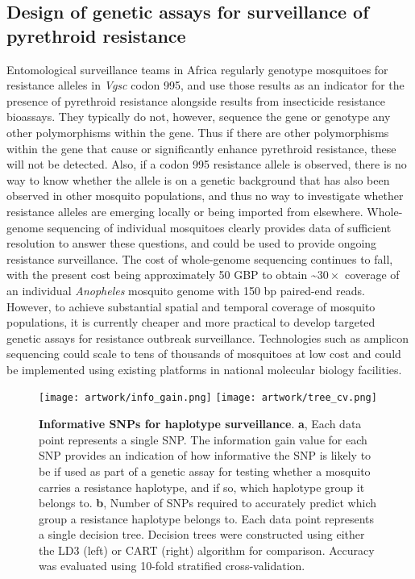 \documentclass[a4paper,11pt,abstracton,hidelinks]{scrartcl}
\begin{document}
\subsection*{Design of genetic assays for surveillance of pyrethroid resistance}

%
Entomological surveillance teams in Africa regularly genotype mosquitoes for resistance alleles in \textit{Vgsc} codon 995, and use those results as an indicator for the presence of pyrethroid resistance alongside results from insecticide resistance bioassays.
%
They typically do not, however, sequence the gene or genotype any other polymorphisms within the gene.
%
Thus if there are other polymorphisms within the gene that cause or significantly enhance pyrethroid resistance, these will not be detected.
%
Also, if a codon 995 resistance allele is observed, there is no way to know whether the allele is on a genetic background that has also been observed in other mosquito populations, and thus no way to investigate whether resistance alleles are emerging locally or being imported from elsewhere.
%
Whole-genome sequencing of individual mosquitoes clearly provides data of sufficient resolution to answer these questions, and could be used to provide ongoing resistance surveillance.
%
The cost of whole-genome sequencing continues to fall, with the present cost being approximately 50 GBP to obtain \textasciitilde$30\times$ coverage of an individual \emph{Anopheles} mosquito genome with 150 bp paired-end reads.
%
However, to achieve substantial spatial and temporal coverage of mosquito populations, it is currently cheaper and more practical to develop targeted genetic assays for resistance outbreak surveillance.
%
Technologies such as amplicon sequencing \cite{Kilianski2015} could scale to tens of thousands of mosquitoes at low cost and could be implemented using existing platforms in national molecular biology facilities.
%


%
\begin{figure}[!t]
  \centering

  \texttt{[image: artwork/info\_gain.png]}
  \texttt{[image: artwork/tree\_cv.png]}

  \caption{%
%
\textbf{Informative SNPs for haplotype surveillance}.
%
\textbf{a}, Each data point represents a single SNP.
%
The information gain value for each SNP provides an indication of how informative the SNP is likely to be if used as part of a genetic assay for testing whether a mosquito carries a resistance haplotype, and if so, which haplotype group it belongs to.
%
\textbf{b}, Number of SNPs required to accurately predict which group a resistance haplotype belongs to.
%
Each data point represents a single decision tree.
%
Decision trees were constructed using either the LD3 (left) or CART (right) algorithm for comparison.
%
Accuracy was evaluated using 10-fold stratified cross-validation.
}

  \label{fig:gain}
\end{figure}
\end{document}
